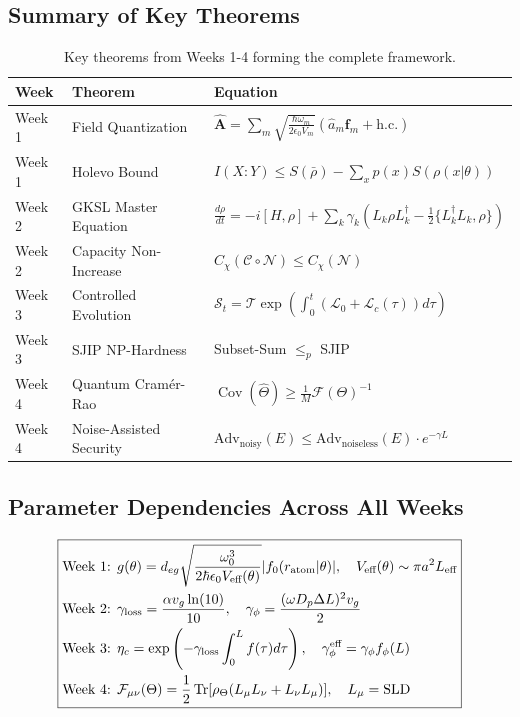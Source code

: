 \documentclass[12pt]{article}
\newcommand{\Cov}{\operatorname{Cov}}
\begin{document}
\subsection{Summary of Key Theorems}

\begin{table}[h]
\centering
\begin{tabular}{|l|l|l|}
\hline
\textbf{Week} & \textbf{Theorem} & \textbf{Equation} \\
\hline
Week 1 & Field Quantization & \(\hat{\mathbf{A}} = \sum_m \sqrt{\frac{\hbar\omega_m}{2\epsilon_0 V_m}}(\hat{a}_m\mathbf{f}_m + \text{h.c.})\) \\
\hline
Week 1 & Holevo Bound & \(I(X:Y) \leq S(\bar{\rho}) - \sum_x p(x)S(\rho(x|\theta))\) \\
\hline
Week 2 & GKSL Master Equation & \(\frac{d\rho}{dt} = -i[H,\rho] + \sum_k \gamma_k(L_k\rho L_k^\dagger - \frac{1}{2}\{L_k^\dagger L_k,\rho\})\) \\
\hline
Week 2 & Capacity Non-Increase & \(C_\chi(\mathcal{C}\circ\mathcal{N}) \leq C_\chi(\mathcal{N})\) \\
\hline
Week 3 & Controlled Evolution & \(\mathcal{S}_t = \mathcal{T}\exp\left(\int_0^t (\mathcal{L}_0 + \mathcal{L}_c(\tau))d\tau\right)\) \\
\hline
Week 3 & SJIP NP-Hardness & Subset-Sum \(\leq_p\) SJIP \\
\hline
Week 4 & Quantum Cram\'er-Rao & \(\Cov(\hat{\Theta}) \geq \frac{1}{M}\mathcal{F}(\Theta)^{-1}\) \\
\hline
Week 4 & Noise-Assisted Security & \(\text{Adv}_{\text{noisy}}(E) \leq \text{Adv}_{\text{noiseless}}(E) \cdot e^{-\gamma L}\) \\
\hline
\end{tabular}
\caption{Key theorems from Weeks 1-4 forming the complete framework.}
\end{table}

\subsection{Parameter Dependencies Across All Weeks}

\begin{equation}
\boxed{
\begin{aligned}
&\text{Week 1: } g(\theta) = d_{eg}\sqrt{\frac{\omega_0^3}{2\hbar\epsilon_0 V_{\text{eff}}(\theta)}}|f_0(r_{\text{atom}}|\theta)|,\quad V_{\text{eff}}(\theta) \sim \pi a^2 L_{\text{eff}} \\
&\text{Week 2: } \gamma_{\text{loss}} = \frac{\alpha v_g\ln(10)}{10},\quad \gamma_\phi = \frac{(\omega D_p \Delta L)^2 v_g}{2} \\
&\text{Week 3: } \eta_c = \exp\left(-\gamma_{\text{loss}}\int_0^L f(\tau)d\tau\right),\quad \gamma_\phi^{\text{eff}} = \gamma_\phi f_\phi(L) \\
&\text{Week 4: } \mathcal{F}_{\mu\nu}(\Theta) = \frac{1}{2}\Tr[\rho_\Theta(L_\mu L_\nu + L_\nu L_\mu)],\quad L_\mu = \text{SLD}
\end{aligned}
}
\end{equation}
\end{document}
